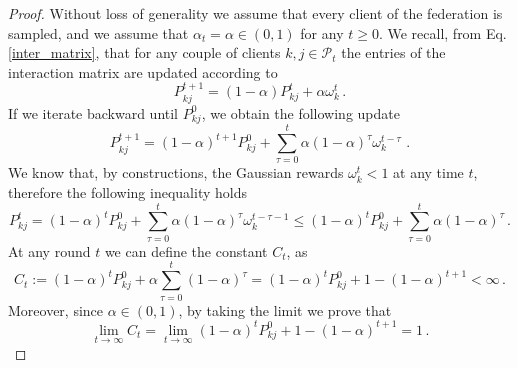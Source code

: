 \begin{proof}
Without loss of generality we assume that every client of the federation is sampled, and we assume that $\alpha_t = \alpha \in (0,1)$ for any $t \geq 0$. We recall, from Eq.\ref{inter_matrix}, that for any couple of clients $k,j \in \mathcal{P}_t$ the entries of the interaction matrix are updated according to 
\begin{equation}
    P_{kj}^{t+1} = (1-\alpha) P_{kj}^t + \alpha \omega_k^t\,.
\end{equation}
If we iterate backward until $P_{kj}^0$, we obtain the following update
\begin{equation}
     P_{kj}^{t+1} = (1-\alpha)^{t+1} P_{kj}^{0}+ \sum_{\tau = 0}^t \alpha (1-\alpha)^\tau \omega_k^{t-\tau}\,\,.
\end{equation}
We know that, by constructions, the Gaussian rewards $\omega_k^t < 1$  at any time $t$, therefore the following inequality holds
\begin{equation}
    P_{kj}^{t} = (1-\alpha)^{t} P_{kj}^{0}+ \sum_{\tau = 0}^t \alpha (1-\alpha)^\tau \omega_k^{t-\tau-1} \leq (1-\alpha)^{t} P_{kj}^{0}+ \sum_{\tau = 0}^t \alpha (1-\alpha)^\tau\,.
\end{equation}
At any round $t$ we can define the constant $C_t$, as
\begin{equation}
    C_t := (1-\alpha)^t P_{kj}^0 + \alpha \sum_{\tau = 0}^t(1-\alpha)^\tau = (1-\alpha)^t P_{kj}^0 + 1 -(1-\alpha)^{t+1} < \infty\,.
\end{equation}
Moreover, since $\alpha \in (0,1)$, by taking the limit we prove that 
\begin{equation}
    \lim_{t \to \infty} C_t = \lim_{t \to \infty} (1-\alpha)^t P_{kj}^0 + 1 -(1-\alpha)^{t+1} = 1\,.
\end{equation}
\end{proof}

